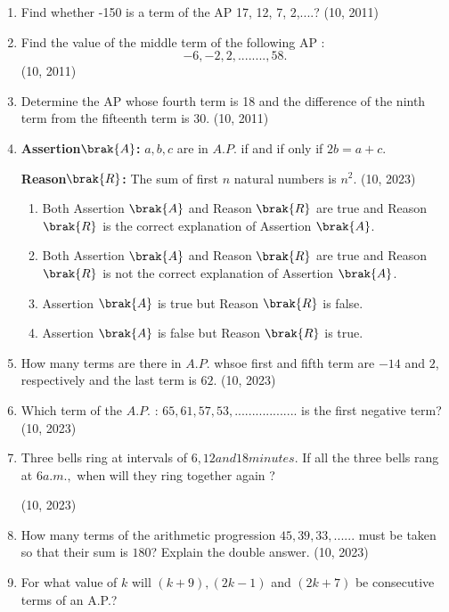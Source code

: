 \begin{enumerate}[label=\thesubsection.\arabic*,ref=\thesubsection.\theenumi,itemsep=1pt]
\begin{multicols}{4}
\begin{enumerate}
\item 10

\item 5

\item -8

\item 8
    \end{enumerate}
\end{multicols}
    \hfill (10, 2011)
\item Find whether -150 is a term of the AP 17, 12, 7, 2,....?
    \hfill (10, 2011)
\item Find the value of the middle term of the following AP :\[- 6, -2, 2,........, 58.\]
   \hfill (10, 2011)
\item Determine the AP whose fourth term is 18 and the difference of the ninth term from the fifteenth term is 30.
    \hfill (10, 2011)
\item
\textbf{Assertion$\brak{A}$:} $a,b,c$ are in $A.P.$ if and if only if $2b = a + c$.

\textbf{Reason$\brak{R}$:} The sum of first $n$ natural numbers is $n^2$.
\hfill (10, 2023)
\begin{enumerate}
\item Both Assertion $\brak{A}$ and Reason $\brak{R}$ are true and Reason $\brak{R}$ is the correct explanation of Assertion $\brak{A}$.
\item Both Assertion $\brak{A}$ and Reason $\brak{R}$ are true and Reason $\brak{R}$ is not the correct explanation of Assertion $\brak{A}$.
\item Assertion $\brak{A}$ is true but Reason $\brak{R}$ is false.
\item Assertion $\brak{A}$ is false but Reason $\brak{R}$ is true.
\end{enumerate}
\item
How many terms are there in $A.P.$ whsoe first and fifth term are $-14$ and $2$, respectively and the last term is $62$.
\hfill (10, 2023)
\item
Which term of the $A.P.$ : $65,61,57,53, ..................$ is the first negative term?
\hfill (10, 2023)
\item Three bells ring at intervals of $ 6, 12 and 18 minutes$. If all the three bells rang at $ 6 a.m.,$ when will they ring together again ?

\hfill (10, 2023)
\item How many terms of the arithmetic progression $45,39,33,......$ must be taken so that their sum is $180$? Explain the double answer.
	 \hfill (10, 2023)
\item For what value of $k$ will $(k+9), (2k-1)$ and $( 2k+7)$ be consecutive terms of an A.P.?


\end{enumerate}
